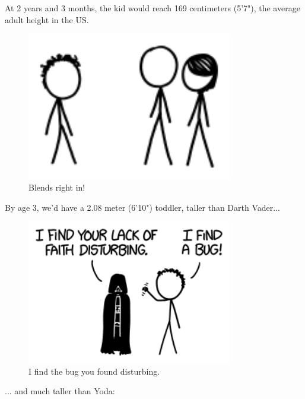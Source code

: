 {{At 2 years and 3 months, the kid would reach 169 centimeters (5'7"), the average adult height in the US.}

\begin{figure}[!htbp]
\centering
\includegraphics[scale=0.5, max width=0.8\textwidth]{imgs/a/77/height_2.png}
\caption{Blends right in!}
\end{figure}

{By age 3, we'd have a 2.08 meter (6'10") toddler, taller than Darth Vader...}

\begin{figure}[!htbp]
\centering
\includegraphics[scale=0.5, max width=0.8\textwidth]{imgs/a/77/height_3.png}
\caption{I find the bug you found disturbing.}
\end{figure}

{... and much taller than Yoda:}

}
